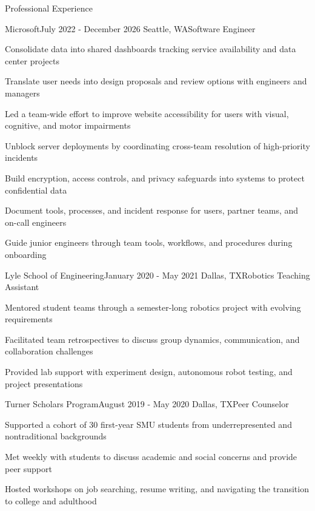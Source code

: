 \documentclass{resume}
\begin{document}
\begin{rSection}{Professional Experience}
    \begin{rSubsection}{Microsoft}{July 2022 - December 2026 \quad Seattle, WA}{Software Engineer}{}
        \item Consolidate data into shared dashboards tracking service availability and data center projects
        \item Translate user needs into design proposals and review options with engineers and managers
        \item Led a team-wide effort to improve website accessibility for users with visual, cognitive, and motor impairments
        \item Unblock server deployments by coordinating cross-team resolution of high-priority incidents
        \item Build encryption, access controls, and privacy safeguards into systems to protect confidential data
        \item Document tools, processes, and incident response for users, partner teams, and on-call engineers
        \item Guide junior engineers through team tools, workflows, and procedures during onboarding
    \end{rSubsection}

    \begin{rSubsection}{Lyle School of Engineering}{January 2020 - May 2021 \quad Dallas, TX}{Robotics Teaching Assistant}{}
        \item Mentored student teams through a semester-long robotics project with evolving requirements
        \item Facilitated team retrospectives to discuss group dynamics, communication, and collaboration challenges
        \item Provided lab support with experiment design, autonomous robot testing, and project presentations
    \end{rSubsection}

    \begin{rSubsection}{Turner Scholars Program}{August 2019 - May 2020 \quad Dallas, TX}{Peer Counselor}{}
        \item Supported a cohort of 30 first-year SMU students from underrepresented and nontraditional backgrounds
        \item Met weekly with students to discuss academic and social concerns and provide peer support
        \item Hosted workshops on job searching, resume writing, and navigating the transition to college and adulthood
    \end{rSubsection}
\end{rSection}
\end{document}
